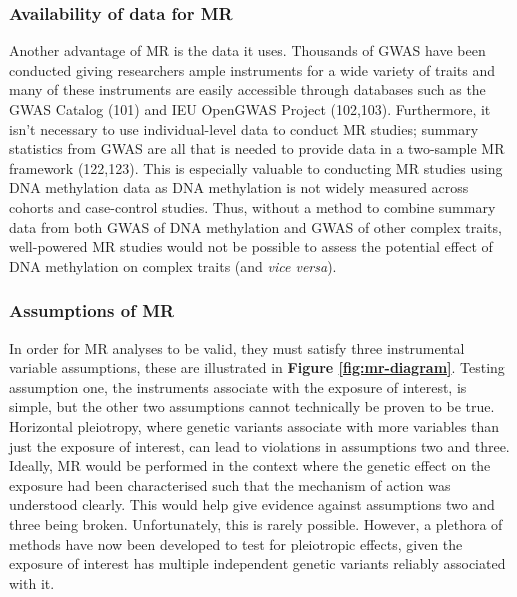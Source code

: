\documentclass[11pt,oneside]{bristolthesis}
\begin{document}
\hypertarget{availability-of-data-for-mr}{%
\subsubsection{Availability of data for MR}\label{availability-of-data-for-mr}}

Another advantage of MR is the data it uses. Thousands of GWAS have been conducted giving researchers ample instruments for a wide variety of traits and many of these instruments are easily accessible through databases such as the GWAS Catalog (101) and IEU OpenGWAS Project (102,103). Furthermore, it isn't necessary to use individual-level data to conduct MR studies; summary statistics from GWAS are all that is needed to provide data in a two-sample MR framework (122,123). This is especially valuable to conducting MR studies using DNA methylation data as DNA methylation is not widely measured across cohorts and case-control studies. Thus, without a method to combine summary data from both GWAS of DNA methylation and GWAS of other complex traits, well-powered MR studies would not be possible to assess the potential effect of DNA methylation on complex traits (and \emph{vice versa}).

\hypertarget{assumptions-of-mr}{%
\subsubsection{Assumptions of MR}\label{assumptions-of-mr}}

In order for MR analyses to be valid, they must satisfy three instrumental variable assumptions, these are illustrated in \textbf{Figure \ref{fig:mr-diagram}}. Testing assumption one, the instruments associate with the exposure of interest, is simple, but the other two assumptions cannot technically be proven to be true. Horizontal pleiotropy, where genetic variants associate with more variables than just the exposure of interest, can lead to violations in assumptions two and three. Ideally, MR would be performed in the context where the genetic effect on the exposure had been characterised such that the mechanism of action was understood clearly. This would help give evidence against assumptions two and three being broken. Unfortunately, this is rarely possible. However, a plethora of methods have now been developed to test for pleiotropic effects, given the exposure of interest has multiple independent genetic variants reliably associated with it.
\end{document}

